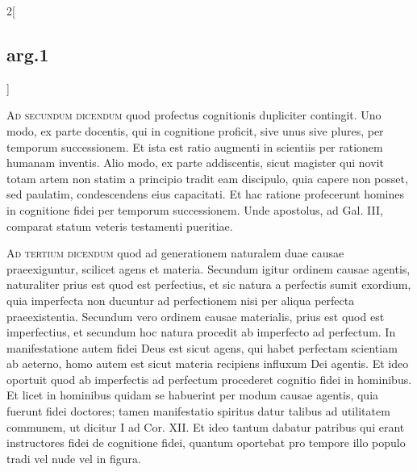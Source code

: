 \documentclass[paper=a4paper,fontsize=10pt,jafontsize=9pt,titlepage]{jlreq}
\begin{document}
\begin{paracol}{2}[\subsection{arg.1}]
\switchcolumn



\switchcolumn*[\subsection{ad.2}]

{\scshape Ad secundum dicendum} quod profectus
cognitionis dupliciter contingit. Uno modo, ex parte docentis, qui in
cognitione proficit, sive unus sive plures, per temporum
successionem. Et ista est ratio augmenti in scientiis per rationem
humanam inventis. Alio modo, ex parte addiscentis, sicut magister qui
novit totam artem non statim a principio tradit eam discipulo, quia
capere non posset, sed paulatim, condescendens eius capacitati. Et hac
ratione profecerunt homines in cognitione fidei per temporum
successionem. Unde apostolus, ad Gal. III, comparat statum veteris
testamenti pueritiae.

\switchcolumn



\switchcolumn*[\subsection{ad.3}]

{\scshape Ad tertium dicendum} quod ad generationem
naturalem duae causae praeexiguntur, scilicet agens et materia. Secundum
igitur ordinem causae agentis, naturaliter prius est quod est
perfectius, et sic natura a perfectis sumit exordium, quia imperfecta
non ducuntur ad perfectionem nisi per aliqua perfecta
praeexistentia. Secundum vero ordinem causae materialis, prius est quod
est imperfectius, et secundum hoc natura procedit ab imperfecto ad
perfectum. In manifestatione autem fidei Deus est sicut agens, qui habet
perfectam scientiam ab aeterno, homo autem est sicut materia recipiens
influxum Dei agentis. Et ideo oportuit quod ab imperfectis ad perfectum
procederet cognitio fidei in hominibus. Et licet in hominibus quidam se
habuerint per modum causae agentis, quia fuerunt fidei doctores; tamen
manifestatio spiritus datur talibus ad utilitatem communem, ut dicitur I
ad Cor. XII. Et ideo tantum dabatur patribus qui erant instructores
fidei de cognitione fidei, quantum oportebat pro tempore illo populo
tradi vel nude vel in figura.

\switchcolumn



\switchcolumn*[\subsection{ad.4}]


\end{paracol}
\end{document}
